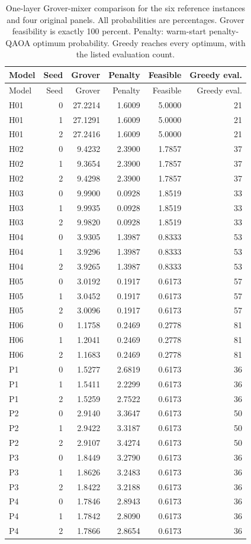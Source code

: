 \begingroup
\small
\setlength{\tabcolsep}{4pt}
\begin{longtable}{lrrrrr}
\caption{One-layer Grover-mixer comparison for the six reference instances and four original panels. All probabilities are percentages. Grover feasibility is exactly 100 percent. Penalty: warm-start penalty-QAOA optimum probability. Greedy reaches every optimum, with the listed evaluation count.}\\
\toprule
Model & Seed & Grover & Penalty & Feasible & Greedy eval.\\
\midrule
\endfirsthead
\toprule
Model & Seed & Grover & Penalty & Feasible & Greedy eval.\\
\midrule
\endhead
H01 & 0 & 27.2214 & 1.6009 & 5.0000 & 21 \\
H01 & 1 & 27.1291 & 1.6009 & 5.0000 & 21 \\
H01 & 2 & 27.2416 & 1.6009 & 5.0000 & 21 \\
H02 & 0 & 9.4232 & 2.3900 & 1.7857 & 37 \\
H02 & 1 & 9.3654 & 2.3900 & 1.7857 & 37 \\
H02 & 2 & 9.4298 & 2.3900 & 1.7857 & 37 \\
H03 & 0 & 9.9900 & 0.0928 & 1.8519 & 33 \\
H03 & 1 & 9.9935 & 0.0928 & 1.8519 & 33 \\
H03 & 2 & 9.9820 & 0.0928 & 1.8519 & 33 \\
H04 & 0 & 3.9305 & 1.3987 & 0.8333 & 53 \\
H04 & 1 & 3.9296 & 1.3987 & 0.8333 & 53 \\
H04 & 2 & 3.9265 & 1.3987 & 0.8333 & 53 \\
H05 & 0 & 3.0192 & 0.1917 & 0.6173 & 57 \\
H05 & 1 & 3.0452 & 0.1917 & 0.6173 & 57 \\
H05 & 2 & 3.0096 & 0.1917 & 0.6173 & 57 \\
H06 & 0 & 1.1758 & 0.2469 & 0.2778 & 81 \\
H06 & 1 & 1.2041 & 0.2469 & 0.2778 & 81 \\
H06 & 2 & 1.1683 & 0.2469 & 0.2778 & 81 \\
P1 & 0 & 1.5277 & 2.6819 & 0.6173 & 36 \\
P1 & 1 & 1.5411 & 2.2299 & 0.6173 & 36 \\
P1 & 2 & 1.5259 & 2.7522 & 0.6173 & 36 \\
P2 & 0 & 2.9140 & 3.3647 & 0.6173 & 50 \\
P2 & 1 & 2.9422 & 3.3187 & 0.6173 & 50 \\
P2 & 2 & 2.9107 & 3.4274 & 0.6173 & 50 \\
P3 & 0 & 1.8449 & 3.2790 & 0.6173 & 36 \\
P3 & 1 & 1.8626 & 3.2483 & 0.6173 & 36 \\
P3 & 2 & 1.8422 & 3.2188 & 0.6173 & 36 \\
P4 & 0 & 1.7846 & 2.8943 & 0.6173 & 36 \\
P4 & 1 & 1.7842 & 2.8090 & 0.6173 & 36 \\
P4 & 2 & 1.7866 & 2.8654 & 0.6173 & 36 \\
\bottomrule
\end{longtable}
\endgroup

